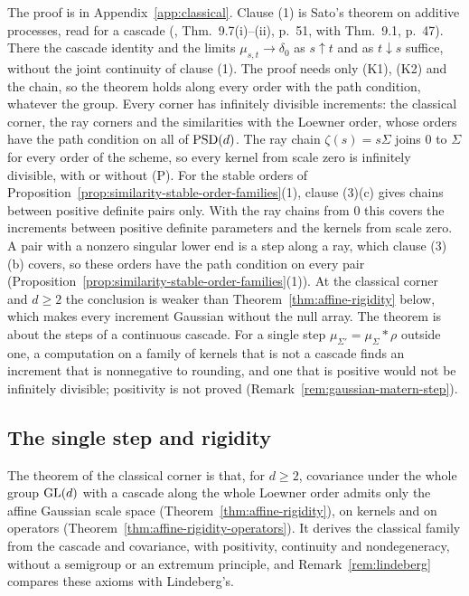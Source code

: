 The proof is in Appendix~\ref{app:classical}. Clause (1) is Sato's theorem on additive processes,
read for a cascade (, Thm.~9.7(i)--(ii), p.~51, with Thm.~9.1, p.~47). There the
cascade identity and the limits $\mu_{s,t} \to \delta_0$ as $s \uparrow t$ and as $t \downarrow s$
suffice, without the joint continuity of clause (1). The proof needs only (K1), (K2) and the chain, so the theorem
holds along every order with the path condition, whatever the group. Every corner has
infinitely divisible increments: the classical corner, the ray corners and the similarities with
the Loewner order, whose orders have the path condition on all of $\mathrm{PSD}(d)$.
The ray chain $\zeta(s) = s\Sigma$ joins $0$ to $\Sigma$ for every order of the scheme, so every kernel
from scale zero is infinitely divisible, with or without (P). For the stable orders
of Proposition~\ref{prop:similarity-stable-order-families}(1), clause (3)(c) gives chains between positive definite pairs only. With the
ray chains from $0$ this covers the increments between
positive definite parameters and the kernels from scale zero. A pair with a nonzero singular lower
end is a step along a ray, which clause (3)(b) covers, so these orders have the path condition on every
pair (Proposition~\ref{prop:similarity-stable-order-families}(1)).
At the classical corner and $d \ge 2$ the conclusion is weaker than
Theorem~\ref{thm:affine-rigidity} below, which makes every increment Gaussian without the null
array. The theorem is about the steps of a continuous cascade. For a single step
$\mu_{\Sigma'} = \mu_\Sigma * \rho$ outside one, a computation on a family of kernels that is not a
cascade finds an increment that is nonnegative to rounding, and one that is positive would not be
infinitely divisible; positivity is not proved (Remark~\ref{rem:gaussian-matern-step}).

\subsection{The single step and rigidity}\label{sec:affine-single-step}

The theorem of the classical corner is that, for $d \ge 2$, covariance under the whole group
$\mathrm{GL}(d)$ with a cascade along the whole Loewner order admits only the affine Gaussian scale space
(Theorem~\ref{thm:affine-rigidity}), on kernels and on operators
(Theorem~\ref{thm:affine-rigidity-operators}). It derives the classical family from the cascade and
covariance, with positivity, continuity and nondegeneracy, without a semigroup or an extremum
principle, and Remark~\ref{rem:lindeberg} compares these axioms with Lindeberg's.

